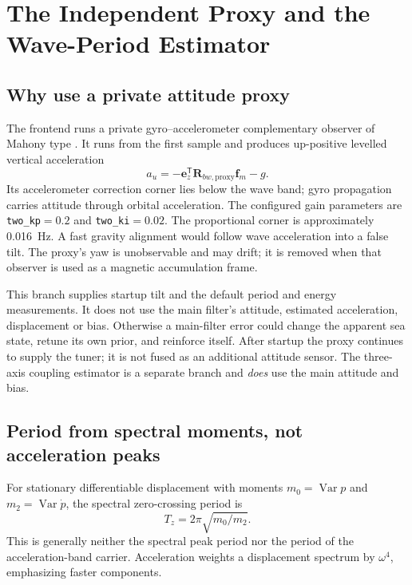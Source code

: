 \documentclass[conference]{IEEEtran}
\newcommand{\vc}[1]{\bm{#1}}
\newcommand{\mt}[1]{\bm{#1}}
\newcommand{\tr}{^{\mathsf T}}
\DeclareMathOperator{\Var}{Var}
\begin{document}
\section{The Independent Proxy and the Wave-Period Estimator}
\label{sec:proxy}
\subsection{Why use a private attitude proxy}
The frontend runs a private gyro--accelerometer complementary observer
of Mahony type \cite{mahony}. It runs from the first sample and produces
up-positive levelled vertical acceleration
\begin{equation}
 a_u=-\vc e_z\tr\mt R_{bw,\mathrm{proxy}}\vc f_m-g.
 \label{eq:verticalproxy}
\end{equation}
Its accelerometer correction corner lies below the wave band; gyro
propagation carries attitude through orbital acceleration. The configured
gain parameters are \texttt{two\_kp}$=0.2$ and
\texttt{two\_ki}$=0.02$. The proportional corner is approximately
0.016~Hz. A fast gravity alignment would follow wave acceleration into a
false tilt. The proxy's yaw is unobservable and may drift; it is removed
when that observer is used as a magnetic accumulation frame.

This branch supplies startup tilt and the default period and energy
measurements. It does not use the main filter's attitude, estimated
acceleration, displacement or bias. Otherwise a main-filter error could
change the apparent sea state, retune its own prior, and reinforce itself.
After startup the proxy continues to supply the tuner; it is not fused as
an additional attitude sensor. The three-axis coupling estimator is a
separate branch and \emph{does} use the main attitude and bias.

\subsection{Period from spectral moments, not acceleration peaks}
For stationary differentiable displacement with moments
$m_0=\Var p$ and $m_2=\Var\dot p$, the spectral zero-crossing period is
\begin{equation}
 T_z=2\pi\sqrt{m_0/m_2}.
 \label{eq:Tz}
\end{equation}
This is generally neither the spectral peak period nor the period of the
acceleration-band carrier. Acceleration weights a displacement spectrum
by $\omega^4$, emphasizing faster components.
\end{document}
